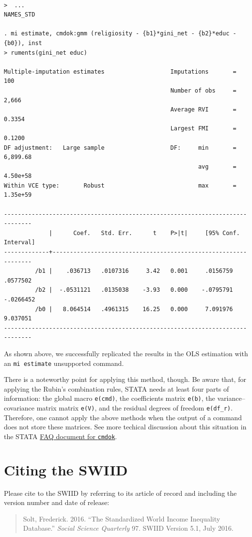 \documentclass[11pt,]{article}
\theoremstyle{definition}
\theoremstyle{definition}
\theoremstyle{remark}
\begin{document}
\begin{verbatim}

>  ...
NAMES_STD

. mi estimate, cmdok:gmm (religiosity - {b1}*gini_net - {b2}*educ - {b0}), inst
> ruments(gini_net educ)

Multiple-imputation estimates                   Imputations       =        100
                                                Number of obs     =      2,666
                                                Average RVI       =     0.3354
                                                Largest FMI       =     0.1200
DF adjustment:   Large sample                   DF:     min       =   6,899.68
                                                        avg       =   4.50e+58
Within VCE type:       Robust                           max       =   1.35e+59

------------------------------------------------------------------------------
             |      Coef.   Std. Err.      t    P>|t|     [95% Conf. Interval]
-------------+----------------------------------------------------------------
         /b1 |    .036713   .0107316     3.42   0.001     .0156759    .0577502
         /b2 |  -.0531121   .0135038    -3.93   0.000    -.0795791   -.0266452
         /b0 |   8.064514   .4961315    16.25   0.000     7.091976    9.037051
------------------------------------------------------------------------------
\end{verbatim}

As shown above, we successfully replicated the results in the OLS
estimation with an \texttt{mi\ estimate} unsupported command.

There is a noteworthy point for applying this method, though. Be aware
that, for applying the Rubin's combination rules, STATA needs at least
four parts of information: the global macro \texttt{e(cmd)}, the
coefficients matrix \texttt{e(b)}, the variance--covariance matrix
matrix \texttt{e(V)}, and the residual degrees of freedom
\texttt{e(df\_r)}. Therefore, one cannot apply the above methods when
the output of a command does not store these matrices. See more techical
discussion about this situation in the STATA
\href{http://www.stata.com/support/faqs/statistics/cmdok-option/\#tech}{FAQ
document for \texttt{cmdok}}.

\section{Citing the SWIID}\label{citing-the-swiid}

Please cite to the SWIID by referring to its article of record and
including the version number and date of release:

\begin{quote}
Solt, Frederick. 2016. ``The Standardized World Income Inequality
Database.'' \emph{Social Science Quarterly} 97. SWIID Version 5.1, July
2016.
\end{quote}

\newpage
\singlespacing 

\end{document}
